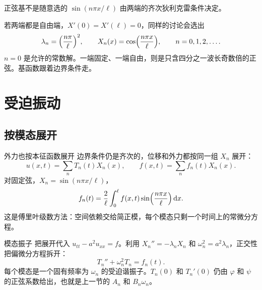\documentclass[fontset=windows, chinese, 10pt, xcolor=dvipsnames]{beamer}
\begin{document}
\begin{frame}{正弦基不是随意选的}
  $\sin(n\pi x/\ell)$ 由两端的齐次狄利克雷条件决定。
  \vspace{0.4em}

  若两端都是自由端，$X'(0)=X'(\ell)=0$，同样的讨论会选出
  \begin{equation*}
    \lambda_n=\Bigl(\frac{n\pi}{\ell}\Bigr)^2,
    \qquad
    X_n(x)=\cos\Bigl(\frac{n\pi x}{\ell}\Bigr),
    \qquad n=0,1,2,\ldots.
  \end{equation*}
  $n=0$ 是允许的常数解。一端固定、一端自由，则是只含四分之一波长奇数倍的正弦。基函数跟着边界条件走。
\end{frame}

\section{受迫振动}

\subsection{按模态展开}

\begin{frame}{外力也按本征函数展开}
  边界条件仍是齐次的，位移和外力都按同一组 $X_n$ 展开：
  \begin{equation*}
    u(x,t)=\sum_n T_n(t)X_n(x),
    \qquad
    f(x,t)=\sum_n f_n(t)X_n(x).
  \end{equation*}
  对固定弦，$X_n=\sin(n\pi x/\ell)$，
  \begin{equation*}
    f_n(t)=\frac{2}{\ell}\int_0^{\ell}
      f(x,t)\sin\Bigl(\frac{n\pi x}{\ell}\Bigr)\,\mathrm{d}x.
  \end{equation*}
  这是傅里叶级数方法：空间依赖交给简正模，每个模态只剩一个时间上的常微分方程。
\end{frame}

\begin{frame}{模态振子}
  把展开代入 $u_{tt}-a^2u_{xx}=f$。利用 $X_n''=-\lambda_n X_n$ 和 $\omega_n^2=a^2\lambda_n$，正交性把偏微分方程拆开：
  \begin{equation*}
    \boxed{T_n''+\omega_n^2 T_n=f_n(t).}
  \end{equation*}
  每个模态是一个固有频率为 $\omega_n$ 的受迫谐振子。$T_n(0)$ 和 $T_n'(0)$ 仍由 $\varphi$ 和 $\psi$ 的正弦系数给出，也就是上一节的 $A_n$ 和 $B_n\omega_n$。
\end{frame}
\end{document}
